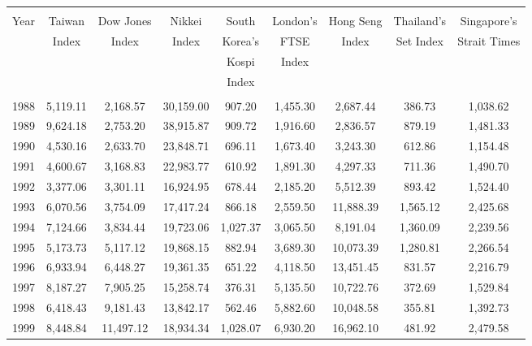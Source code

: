 \documentclass{ws-rv9x6}
\begin{document}
\begin{sidewaystable}	%
{\begin{tabular}{@{}ccccccccc@{}}
\hline
\multicolumn{9}{c}{}\\[-2ex]
Year &Taiwan &Dow Jones &Nikkei &South &London's &Hong Seng &Thailand's
&Singapore's\\
{} &Index &Index &Index &Korea's &FTSE &Index &Set Index &Strait Times\\
{} &{} &{} &{} &Kospi &Index &{} &{} &{}\\
{} &{} &{} &{} &Index &{} &{} &{} &{}\\[0.25ex]
\hline
\multicolumn{9}{c}{}\\[-2ex]
1988 &5,119.11 &\phantom{0}2,168.57 &30,159.00 &907.20 &1,455.30
&\phantom{0}2,687.44 &386.73 &1,038.62\\ 
1989 &9,624.18 &\phantom{0}2,753.20 &38,915.87 &909.72 &1,916.60
&\phantom{0}2,836.57 &879.19 &1,481.33\\
1990 &4,530.16 &\phantom{0}2,633.70 &23,848.71 &696.11 &1,673.40
&\phantom{0}3,243.30 &612.86 &1,154.48\\
1991 &4,600.67 &\phantom{0}3,168.83 &22,983.77 &610.92 &1,891.30
&\phantom{0}4,297.33 &711.36 &1,490.70\\
1992 &3,377.06 &\phantom{0}3,301.11 &16,924.95 &678.44 &2,185.20
&\phantom{0}5,512.39 &893.42 &1,524.40\\
1993 &6,070.56 &\phantom{0}3,754.09 &17,417.24 &866.18 &2,559.50
&11,888.39 &1,565.12\phantom{0.} &2,425.68\\
1994 &7,124.66 &\phantom{0}3,834.44 &19,723.06 &1,027.37\phantom{0.}
&3,065.50 &\phantom{0}8,191.04 &1,360.09\phantom{0.} &2,239.56\\
1995 &5,173.73 &\phantom{0}5,117.12 &19,868.15 &882.94 &3,689.30
&10,073.39 &1,280.81\phantom{0.} &2,266.54\\
1996 &6,933.94 &\phantom{0}6,448.27 &19,361.35 &651.22 &4,118.50
&13,451.45 &831.57 &2,216.79\\
1997 &8,187.27 &\phantom{0}7,905.25 &15,258.74 &376.31 &5,135.50
&10,722.76 &372.69 &1,529.84\\
1998 &6,418.43 &\phantom{0}9,181.43 &13,842.17 &562.46 &5,882.60
&10,048.58 &355.81 &1,392.73\\
1999 &8,448.84 &11,497.12 &18,934.34 &1,028.07\phantom{0.} &6,930.20
&16,962.10 &481.92 &2,479.58\\

\end{tabular}}
\end{sidewaystable}
\end{document}
